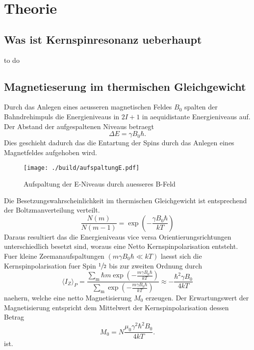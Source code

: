 \section{Theorie}%
\label{sec:theorie}
\subsection{Was ist Kernspinresonanz ueberhaupt}%
to do
\subsection{Magnetieserung im thermischen Gleichgewicht}%
\label{ssub:magnetieserung_im_thermischen_gleichgewicht}
Durch das Anlegen eines aeusseren magnetischen Feldes $B_0$ spalten der Bahndrehimpuls die Energieniveaus in $2 I
+ 1$ in aequidistante Energieniveaus auf. 
Der Abstand der aufgespaltenen Niveaus betraegt 
\begin{equation}
		\label{eq:delta_e}
		\Delta E = \gamma B_0 \hbar. 
\end{equation}
Dies geschieht dadurch das die Entartung der Spins durch das Anlegen eines
Magnetfeldes aufgehoben wird.
\begin{figure}[ht]
		\centering
		\texttt{[image: ./build/aufspaltungE.pdf]}
		\caption{Aufspaltung der E-Niveaus durch auesseres B-Feld}
		\label{fig:aufsp_E}
\end{figure}
Die Besetzungswahrscheinlichkeit im thermischen Gleichgewicht ist entsprechend
der Boltzmanverteilung verteilt.
\begin{equation}
		\label{eq:boltzmann}
		\frac{N(m)}{N(m-1)} = \exp \left( - \frac{\gamma B_0 \hbar}{kT} \right)
\end{equation}
Daraus resultiert das die Energieniveaus vice versa Orientierungsrichtungen unterschiedlich
besetzt sind, woraus eine Netto Kernspinpolarisation entsteht. 
Fuer kleine Zeemanaufspaltungen $(m \gamma B_0 \hbar \ll kT)$ laesst sich die
Kernspinpolarisation fuer Spin $\sfrac{1}{2}$ bis zur
zweiten Ordnung durch
\begin{equation}
		\label{eq:kernpo}
		\langle I_Z \rangle_P = \frac{\sum_\text{m} \hbar m \exp\left(-\frac{m \gamma B_0
		\hbar}{kT}\right)}{\sum_\text{m}\exp\left(-\frac{m \gamma B_0
		\hbar}{kT}\right)} \approx - \frac{\hbar^2 \gamma B_0}{4 kT}
\end{equation}
naehern, welche eine netto Magnetisierung $M_0$ erzeugen. 
Der Erwartungswert der Magnetisierung entspricht dem Mittelwert der
Kernspinpolarisation dessen Betrag 
\begin{equation}
		\label{eq:magn}
		M_0 = N \frac{\mu_0 \gamma^2 \hbar^2 B_0}{4 kT} .
\end{equation}
ist.

